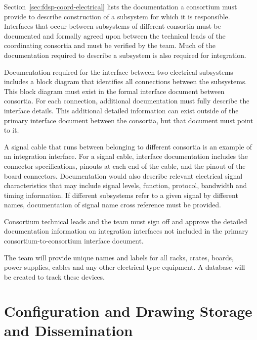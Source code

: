 Section~\ref{sec:fdsp-coord-electrical} lists the documentation a consortium must provide
to describe construction of a subsystem for which it is responsible. Interfaces that occur
between subsystems of different consortia must be documented and formally agreed
upon between the technical leads of the coordinating consortia and
must be verified by the  team.  Much of the
documentation required to describe a subsystem is also required for
integration. 


Documentation required for the interface between two electrical
subsystems includes a block diagram that identifies all connections
between the subsystems.  This block diagram must exist in the formal
interface document between consortia.  For each connection, additional
documentation must fully describe the interface
details. This additional detailed information can exist outside of the
primary interface document between the consortia, but that document must point to it.


A signal cable that runs
between  belonging to different consortia is an example of an 
integration interface.  For
a signal cable, interface documentation includes the connector
specifications, pinouts at each end of the cable, and the pinout of the
board connectors.  Documentation would also describe 
relevant electrical signal characteristics that may include signal
levels, function, protocol, bandwidth and timing information.  If
different subsystems refer to a given signal by different names, 
documentation of signal name cross reference must be
provided.

Consortium technical leads and the  team must sign off
and approve the detailed documentation information on integration
interfaces not included in the primary consortium-to-consortium
interface document.

The  team will provide unique names and labels
for all racks, crates, boards, power supplies, cables and any other
electrical type equipment.  A database will be created to track these
devices.

\section{Configuration and Drawing Storage and Dissemination}
\label{sec:fdsp-coord-integ-modelplan}

